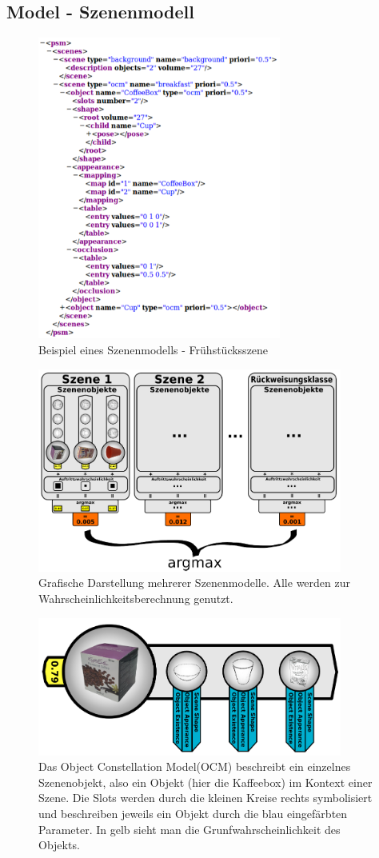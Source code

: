 \subsection{Model - Szenenmodell}
\begin{figure}
	\centering
	\includegraphics[width=8cm]{bilder/Modell.pdf}
	\caption{Beispiel eines Szenenmodells - Frühstücksszene \cite{gehrung14}}
	\label{img:modelexample}
\end{figure}
\begin{figure}
	\centering
	\includegraphics[width=10cm]{bilder/argmax.pdf}
	\caption{Grafische Darstellung mehrerer Szenenmodelle. Alle werden zur Wahrscheinlichkeitsberechnung genutzt. \cite{gehrung14}}
	\label{img:argmax}
\end{figure}
\begin{figure}
	\centering
	\includegraphics[width=10cm]{bilder/terms.pdf}
	\caption{Das Object Constellation Model(OCM) beschreibt ein einzelnes Szenenobjekt,
also ein Objekt (hier die Kaffeebox) im Kontext einer Szene. Die Slots
werden durch die kleinen Kreise rechts symbolisiert und beschreiben jeweils ein Objekt durch die blau eingefärbten Parameter. In gelb sieht man die Grunfwahrscheinlichkeit des Objekts. \cite{gehrung14}}
	\label{img:terms}
\end{figure}
